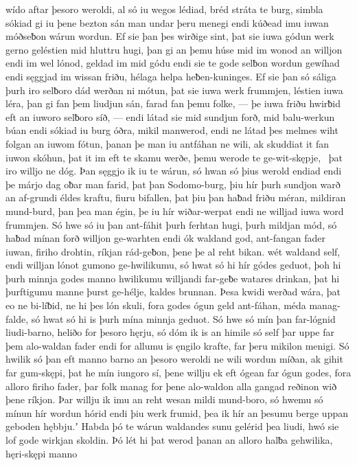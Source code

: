 wído aftar þesoro weroldi, al só iu wegos lédiad,
bréd stráta te burg, simbla sókiad gi iu þene bezton sán
man undar þeru menegi endi kúðead imu iuwan móðseƀon
wárun wordun. Ef sie þan þes wirðige sint,
þat sie iuwa gódun werk gerno geléstien
mid hluttru hugi, þan gi an þemu húse mid im
wonod an willjon endi im wel lónod,
geldad im mid gódu endi sie te gode selƀon
wordun gewíhad endi sęggjad im wissan friðu,
hélaga helpa heƀen-kuninges.
Ef sie þan só sáliga þurh iro selƀoro dád
werðan ni mótun, þat sie iuwa werk frummjen,
léstien iuwa léra, þan gi fan þem liudjun sán,
farad fan þemu folke, — þe iuwa friðu hwirƀid
eft an iuworo selƀoro síð, — endi látad sie mid sundjun forð,
mid balu-werkun búan endi sókiad iu burg óðra,
mikil manwerod, endi ne látad þes melmes wiht
folgan an iuwom fótun, þanan þe man iu antfáhan ne wili,
ak skuddiat it fan iuwon skóhun, þat it im eft te skamu werðe,
þemu werode te ge-wit-skępje, \hld\ þat iro willjo ne dóg.
Þan sęggjo ik iu te wárun, só hwan só þius werold endiad
endi þe márjo dag oƀar man farid,
þat þan Sodomo-burg, þiu hír þurh sundjon warð
an af-grundi éldes kraftu,
fiuru bifallen, þat þiu þan haƀad friðu méran,
mildiran mund-burd, þan þea man égin,
þe iu hír wiðar-werpat endi ne willjad iuwa word frummjen.
Só hwe só iu þan ant-fáhit þurh ferhtan hugi,
þurh mildjan mód, só haƀad mínan forð
willjon ge-warhten endi ók waldand god,
ant-fangan fader iuwan, firiho drohtin,
ríkjan rád-geƀon, þene þe al reht bikan.
wét waldand self, endi willjan lónot
gumono ge-hwilikumu, só hwat só hi hír gódes geduot,
þoh hi þurh minnja godes manno hwilikumu
willjandi far-geƀe watares drinkan,
þat hi þurftigumu manne þurst ge-hélje,
kaldes brunnan. Þesa kwidi werðad wára,
þat eo ne bi-líƀid, ne hi þes lón skuli,
fora godes ógun geld ant-fáhan,
méda manag-falde, só hwat só hi is þurh mína minnja geduot.
Só hwe só mín þan far-lógnid liudi-barno,
heliðo for þesoro hęrju, só dóm ik is an himile só self
þar uppe far þem alo-waldan fader endi for allumu is ęngilo krafte,
far þeru mikilon menigi. Só hwilik só þan eft manno barno
an þesoro weroldi ne wili wordun míðan,
ak gihit far gum-skępi, þat he mín iungoro sí,
þene willju ek eft ógean far ógun godes,
fora alloro firiho fader, þar folk manag
for þene alo-waldon alla gangad
reðinon wið þene ríkjon. Þar willju ik imu an reht wesan
mildi mund-boro, só hwemu só mínun hír
wordun hórid endi þiu werk frumid,
þea ik hír an þesumu berge uppan geboden hębbju.ʼ
Habda þó te wárun waldandes sunu
gelérid þea liudi, hwó sie lof gode
wirkjan skoldin. Þó lét hi þat werod þanan
an alloro halƀa gehwilika, hęri-skępi manno
